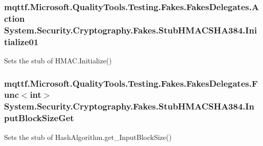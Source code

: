 \hypertarget{class_system_1_1_security_1_1_cryptography_1_1_fakes_1_1_stub_h_m_a_c_s_h_a384_a0c592ed777a6486da7dc22f0ded21eb2}{
\subsubsection[{Initialize01}]{\setlength{\rightskip}{0pt plus 5cm}mqttf.\-Microsoft.\-Quality\-Tools.\-Testing.\-Fakes.\-Fakes\-Delegates.\-Action System.\-Security.\-Cryptography.\-Fakes.\-Stub\-H\-M\-A\-C\-S\-H\-A384.\-Initialize01}}\label{class_system_1_1_security_1_1_cryptography_1_1_fakes_1_1_stub_h_m_a_c_s_h_a384_a0c592ed777a6486da7dc22f0ded21eb2}


Sets the stub of H\-M\-A\-C.\-Initialize()

\hypertarget{class_system_1_1_security_1_1_cryptography_1_1_fakes_1_1_stub_h_m_a_c_s_h_a384_a25db56d1b9ee1dcaed57bfda5854ac14}{
\subsubsection[{Input\-Block\-Size\-Get}]{\setlength{\rightskip}{0pt plus 5cm}mqttf.\-Microsoft.\-Quality\-Tools.\-Testing.\-Fakes.\-Fakes\-Delegates.\-Func$<$int$>$ System.\-Security.\-Cryptography.\-Fakes.\-Stub\-H\-M\-A\-C\-S\-H\-A384.\-Input\-Block\-Size\-Get}}\label{class_system_1_1_security_1_1_cryptography_1_1_fakes_1_1_stub_h_m_a_c_s_h_a384_a25db56d1b9ee1dcaed57bfda5854ac14}


Sets the stub of Hash\-Algorithm.\-get\-\_\-\-Input\-Block\-Size()

